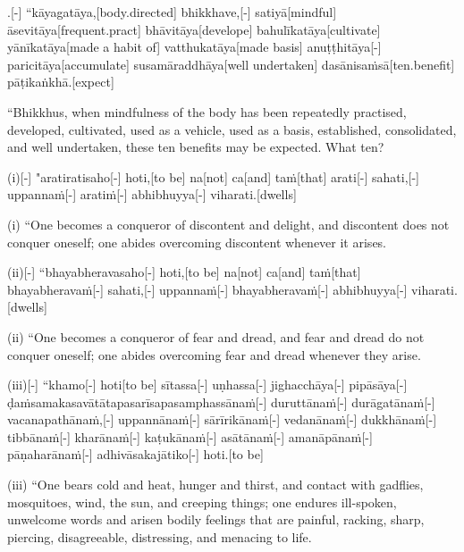 \begin{samepage}
.[-] “kāyagatāya,[body.directed] bhikkhave,[-] satiyā[mindful] āsevitāya[frequent.pract] bhāvitāya[develope] bahulīkatāya[cultivate] yānīkatāya[made a habit of] vatthukatāya[made basis] anuṭṭhitāya[-] paricitāya[accumulate] susamāraddhāya[well undertaken] dasānisaṁsā[ten.benefit] pāṭikaṅkhā.[expect]
\endgl
\nopagebreak
\linespread{0.5}
\begin{spacin}{0.2}
{\PaliGlossFT “Bhikkhus, when mindfulness of the body has been repeatedly practised, developed, cultivated, used as a vehicle, used as a basis, established, consolidated, and well undertaken, these ten benefits may be expected. What ten?}
\end{spacin}
\vskip 12pt
\end{samepage}
\begin{samepage}
\begingl[glneveryline={\PaliGlossA,\PaliGlossB}]
(i)[-] "aratiratisaho[-] hoti,[to be] na[not] ca[and] taṁ[that] arati[-] sahati,[-] uppannaṁ[-] aratiṁ[-] abhibhuyya[-] viharati.[dwells]
\endgl
\nopagebreak
\linespread{0.5}
\begin{spacin}{0.2}
{\PaliGlossFT (i) “One becomes a conqueror of discontent and delight, and discontent does not conquer oneself; one abides overcoming discontent whenever it arises.}
\end{spacin}
\vskip 12pt
\end{samepage}
\begin{samepage}
\begingl[glneveryline={\PaliGlossA,\PaliGlossB}]
(ii)[-] “bhayabheravasaho[-] hoti,[to be] na[not] ca[and] taṁ[that] bhayabheravaṁ[-] sahati,[-] uppannaṁ[-] bhayabheravaṁ[-] abhibhuyya[-] viharati.[dwells]
\endgl
\nopagebreak
\linespread{0.5}
\begin{spacin}{0.2}
{\PaliGlossFT (ii) “One becomes a conqueror of fear and dread, and fear and dread do not conquer oneself; one abides overcoming fear and dread whenever they arise.}
\end{spacin}
\vskip 12pt
\end{samepage}
\begin{samepage}
\begingl[glneveryline={\PaliGlossA,\PaliGlossB}]
(iii)[-] “khamo[-] hoti[to be] sītassa[-] uṇhassa[-] jighacchāya[-] pipāsāya[-] ḍaṁsamakasavātātapasarīsapasamphassānaṁ[-] duruttānaṁ[-] durāgatānaṁ[-] vacanapathānaṁ,[-] uppannānaṁ[-] sārīrikānaṁ[-] vedanānaṁ[-] dukkhānaṁ[-] tibbānaṁ[-] kharānaṁ[-] kaṭukānaṁ[-] asātānaṁ[-] amanāpānaṁ[-] pāṇaharānaṁ[-] adhivāsakajātiko[-] hoti.[to be]
\endgl
\nopagebreak
\linespread{0.5}
\begin{spacin}{0.2}
{\PaliGlossFT (iii) “One bears cold and heat, hunger and thirst, and contact with gadflies, mosquitoes, wind, the sun, and creeping things; one endures ill-spoken, unwelcome words and arisen bodily feelings that are painful, racking, sharp, piercing, disagreeable, distressing, and menacing to life.}
\end{spacin}
\vskip 12pt
\end{samepage}
